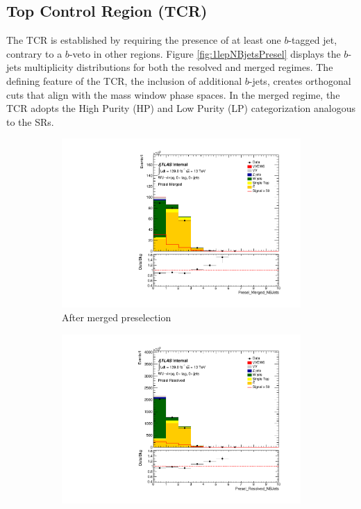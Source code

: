 \subsection{Top Control Region (TCR)}
\label{tcr_definition}

The TCR is established by requiring the presence of at least one $b$-tagged jet, contrary to a $b$-veto in other regions. Figure \ref{fig:1lepNBjetsPresel} displays the $b$-jets multiplicity distributions for both the resolved and merged regimes. 
The defining feature of the TCR, the inclusion of additional $b$-jets, creates orthogonal cuts that align with the mass window phase spaces. 
In the merged regime, the TCR adopts the High Purity (HP) and Low Purity (LP) categorization analogous to the SRs.

\begin{figure}[ht]
    \centering
    \begin{subfigure}{0.32\textwidth}
        \includegraphics[width=\linewidth]{figures/event_selection/Presel_Merged_NBJets.pdf}
        \caption{After merged preselection}
    \end{subfigure}
    \begin{subfigure}{0.32\textwidth}
        \includegraphics[width=\linewidth]{figures/event_selection/Presel_Resolved_NBJets.pdf}

\end{subfigure}
\end{figure}
